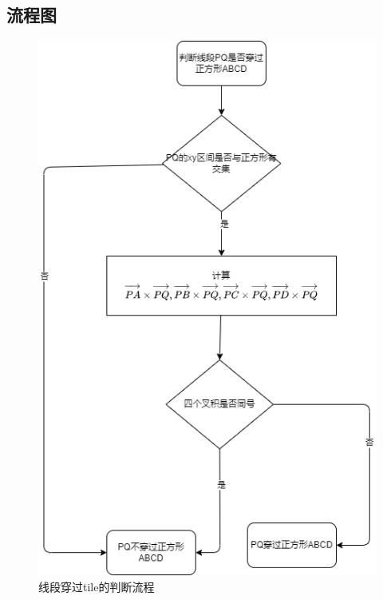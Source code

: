 {    \subsection{流程图}
    \begin{figure}[H]
        \centering
        \includegraphics[width=.9\textwidth]{figure/linethroughrectangle.png}
        \caption{线段穿过tile的判断流程}
        \label{fig:line through tile flow chart}
    \end{figure}
    \begin{figure}[H]
        \centering

\end{figure}}
